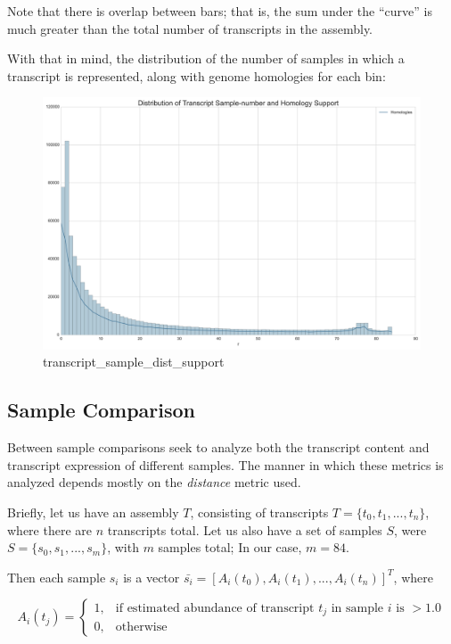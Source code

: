 \documentclass{article}
\begin{document}
Note that there is overlap between bars; that is, the sum under the
``curve'' is much greater than the total number of transcripts in the
assembly.

With that in mind, the distribution of the number of samples in which a
transcript is represented, along with genome homologies for each bin:

\begin{figure}[htbp]
\centering
\includegraphics{transcript_sample_dist_support.svg}
\caption{transcript\_sample\_dist\_support}
\end{figure}


    \subsection{Sample Comparison}


    Between sample comparisons seek to analyze both the transcript content
and transcript expression of different samples. The manner in which
these metrics is analyzed depends mostly on the \emph{distance} metric
used.

Briefly, let us have an assembly $T$, consisting of transcripts
$T=\{t_0,t_1,...,t_n\}$, where there are $n$ transcripts total. Let us
also have a set of samples $S$, were $S=\{s_0,s_1,...,s_m\}$, with $m$
samples total; In our case, $m=84$.

Then each sample $s_i$ is a vector
$\bar{s_i}=[ A_i(t_0),A_i(t_1),...,A_i(t_n) ]^T $, where

\[A_i(t_j) = \begin{cases}
1, & \text{if estimated abundance of transcript } t_j \text{ in sample } i \text{ is } > 1.0 \\
0, & \text{otherwise}
\end{cases}\]
\end{document}
